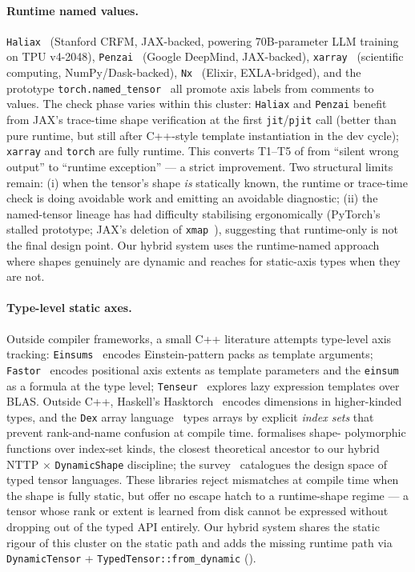 \documentclass[10pt,twocolumn]{article}
\newcommand{\code}[1]{\texttt{#1}}
\begin{document}
\paragraph{Runtime named values.}
\code{Haliax}~\cite{haliax} (Stanford CRFM, JAX-backed, powering
70B-parameter LLM training on TPU v4-2048),
\code{Penzai}~\cite{penzai} (Google DeepMind, JAX-backed),
\code{xarray}~\cite{xarray} (scientific computing, NumPy/Dask-backed),
\code{Nx}~\cite{nx-elixir} (Elixir, EXLA-bridged), and the prototype
\code{torch.named\_tensor}~\cite{pytorch-named-tensors} all promote
axis labels from comments to values. The check phase varies within
this cluster: \code{Haliax} and \code{Penzai} benefit from JAX's
trace-time shape verification at the first \code{jit}/\code{pjit}
call (better than pure runtime, but still after C++-style template
instantiation in the dev cycle); \code{xarray} and \code{torch} are
fully runtime. This converts T1--T5 of  from
``silent wrong output'' to ``runtime exception'' --- a strict
improvement. Two structural limits remain:
(i) when the tensor's shape \emph{is} statically known, the runtime
or trace-time check is doing avoidable work and emitting an
avoidable diagnostic;
(ii) the named-tensor lineage has had difficulty stabilising
ergonomically (PyTorch's stalled prototype; JAX's deletion of
\code{xmap}~\cite{jax-xmap-deletion}), suggesting that
runtime-only is not the final design point. Our hybrid system uses
the runtime-named approach where shapes genuinely are dynamic and
reaches for static-axis types when they are not.

\paragraph{Type-level static axes.}
Outside compiler frameworks, a small C++ literature attempts
type-level axis tracking: \code{Einsums}~\cite{einsums-cpp} encodes
Einstein-pattern packs as template arguments;
\code{Fastor}~\cite{fastor} encodes positional axis extents as
template parameters and the \code{einsum} as a formula at the type
level; \code{Tenseur}~\cite{tenseur} explores lazy expression
templates over BLAS. Outside C++, Haskell's
Hasktorch~\cite{hasktorch2020} encodes dimensions in
higher-kinded types, and the \code{Dex} array
language~\cite{paszke2021dex,maclaurin2019dex} types arrays by
explicit \emph{index sets} that prevent rank-and-name confusion at
compile time. \cite{krishnan2024shapelang} formalises shape-
polymorphic functions over index-set kinds, the closest theoretical
ancestor to our hybrid NTTP $\times$ \code{DynamicShape} discipline;
the survey~\cite{rink2018modeling} catalogues the design space of
typed tensor languages. These libraries
reject mismatches at compile time when the shape is fully static,
but offer no escape hatch to a runtime-shape regime --- a tensor
whose rank or extent is learned from disk cannot be expressed
without dropping out of the typed API entirely. Our hybrid system
shares the static rigour of this cluster on the static path and adds
the missing runtime path via \code{DynamicTensor} +
\code{TypedTensor::from\_dynamic} ().
\end{document}
